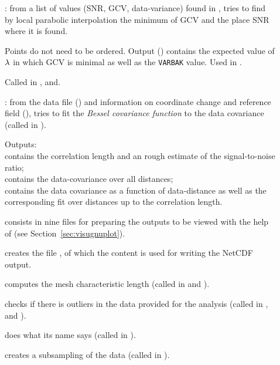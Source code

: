 \begin{description}
\item[]: from a list of values (SNR, GCV, data-variance) found in , tries 
to find by local parabolic interpolation the minimum of GCV and the place SNR where it is found.

Points do not need to be ordered. Output () contains the 
expected value of $\lambda$ in which GCV is minimal as well as the \texttt{VARBAK} 
value. Used in .

Called in , and.


\item[]: from the data file () and information on coordinate change and 
reference field (), tries to fit the \textit{Bessel covariance function} to the data covariance (called in ).


Outputs:\\
 contains the correlation length and an rough estimate of the signal-to-noise ratio;\\
 contains the data-covariance over all distances;\\ 
 contains the data covariance as a function of data-distance as well as the corresponding fit over distances up to the correlation length.

\item[] consists in nine files for preparing the outputs to be viewed with the help of \gnuplot (see Section~\ref{sec:visugnuplot}). 

\item[] creates the file , of which the content is used for writing the NetCDF output.

\item[] computes the mesh characteristic length (called in  and ).

\item[] checks if there is outliers in the data provided for the analysis (called in ,  and ).

\item[] does what its name says (called in ).

\item[] creates a subsampling of the data (called in ).


\end{description}
